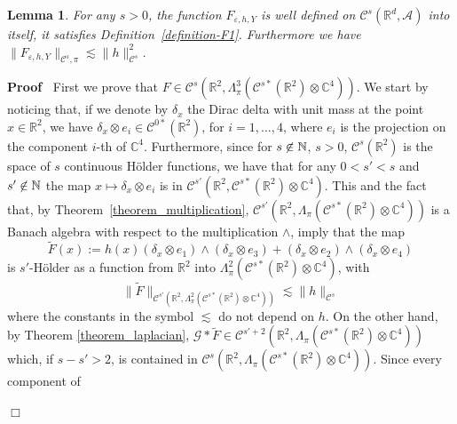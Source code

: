\documentclass{article}
\newcommand{\assign}{:=}
\newenvironment{proof}{\noindent\textbf{Proof\ }}{\hspace*{\fill}$\Box$\medskip}
\newtheorem{lemma}[theorem]{Lemma}
\begin{document}
\begin{lemma}
  \label{lemma_drift}For any $s > 0$, the function $F_{\varepsilon, h, Y}$ is
  well defined on $\mathcal{C}^s (\mathbb{R}^d, \mathcal{A})$ into itself, it
  satisfies Definition~\ref{definition-F1}. Furthermore we have $\|
  F_{\varepsilon, h, Y} \|_{\mathcal{C}^s, \pi} \lesssim \| h
  \|_{\mathcal{C}^s}^2$.
\end{lemma}

\begin{proof}
  First we prove that $F \in \mathcal{C}^s (\mathbb{R}^2, \Lambda_{\pi}^3
  (\mathcal{C}^{s \ast} (\mathbb{R}^2) \otimes \mathbb{C}^4))$. We start by
  noticing that, if we denote by $\delta_x$ the Dirac delta with unit mass at
  the point $x \in \mathbb{R}^2$, we have $\delta_x \otimes e_i \in
  \mathcal{C}^{0 \ast} (\mathbb{R}^2)$, for $i = 1, \ldots, 4$, where $e_i$ is
  the projection on the component $i$-th of $\mathbb{C}^4$. Furthermore, since
  for $s \centernot{\in} \mathbb{N}$, $s > 0$, $\mathcal{C}^s (\mathbb{R}^2)$ is the
  space of $s$ continuous H{\"o}lder functions, we have that for any $0 < s' <
  s$ and $s' \centernot{\in} \mathbb{N}$ the map $x \longmapsto \delta_x \otimes
  e_i$ is in $\mathcal{C}^{s'} (\mathbb{R}^2, \mathcal{C}^{s \ast}
  (\mathbb{R}^2) \otimes \mathbb{C}^4)$. This and the fact that, by
  Theorem~\ref{theorem_multiplication}, $\mathcal{C}^{s'} (\mathbb{R}^2,
  \Lambda_{\pi} (\mathcal{C}^{s \ast} (\mathbb{R}^2) \otimes \mathbb{C}^4))$
  is a Banach algebra with respect to the multiplication $\wedge$, imply that
  the map
  \[ \tilde{F} (x) \assign h (x) (\delta_x \otimes e_1) \wedge (\delta_x
     \otimes e_3) + (\delta_x \otimes e_2) \wedge (\delta_x \otimes e_4) \]
  is $s'$-H{\"o}lder as a function from $\mathbb{R}^2$ into $\Lambda_{\pi}^2
  (\mathcal{C}^{s \ast} (\mathbb{R}^2) \otimes \mathbb{C}^4)$, with
  \begin{equation}
    \| \tilde{F} \|_{\mathcal{C}^{s'} (\mathbb{R}^2, \Lambda_{\pi}^2
    (\mathcal{C}^{s \ast} (\mathbb{R}^2) \otimes \mathbb{C}^4))} \lesssim \| h
    \|_{\mathcal{C}^s} \label{eq:inequalityh1}
  \end{equation}
  where the constants in the symbol $\lesssim$ do not depend on $h$. On the
  other hand, by Theorem \ref{theorem_laplacian}, $\mathcal{G} \ast \tilde{F}
  \in \mathcal{C}^{s' + 2} (\mathbb{R}^2, \Lambda_{\pi} (\mathcal{C}^{s \ast}
  (\mathbb{R}^2) \otimes \mathbb{C}^4))$ which, if $s - s' > 2$, is contained
  in $\mathcal{C}^s (\mathbb{R}^2, \Lambda_{\pi} (\mathcal{C}^{s \ast}
  (\mathbb{R}^2) \otimes \mathbb{C}^4))$. Since every component of

\end{proof}
\end{document}

